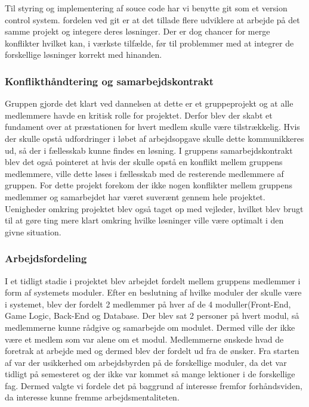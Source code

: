 Til styring og implementering af souce code har vi benytte git som et version control system.
fordelen ved git er at det tillade flere udviklere at arbejde på det samme projekt og integere 
deres løsninger. Der er dog chancer for merge konflikter hvilket kan, i værkste tilfælde, før
til problemmer med at integrer de forskellige løsninger korrekt med hinanden.

\subsubsection{Konflikthåndtering og samarbejdskontrakt}
Gruppen gjorde det klart ved dannelsen at dette er et gruppeprojekt og at alle medlemmere havde en kritisk rolle for projektet. Derfor blev der skabt et fundament over at præstationen for hvert medlem skulle være tilstrækkelig. Hvis der skulle opstå udfordringer i løbet af arbejdsopgave skulle dette kommunikkeres ud, så der i fællesskab kunne findes en løsning. I gruppens samarbejdskontrakt blev det også pointeret at hvis der skulle opstå en konflikt mellem gruppens medlemmere, ville dette løses i fællesskab med de resterende medlemmere af gruppen. For dette projekt forekom der ikke nogen konflikter mellem gruppens medlemmer og samarbejdet har været suverænt gennem hele projektet. Uenigheder omkring projektet blev også taget op med vejleder, hvilket blev brugt til at gøre ting mere klart omkring hvilke løsninger ville være optimalt i den givne situation. 

\subsubsection{Arbejdsfordeling}
I et tidligt stadie i projektet blev arbejdet fordelt mellem gruppens medlemmer i form af systemets moduler. Efter en beslutning af hvilke moduler der skulle være i systemet, blev der fordelt 2 medlemmer på hver af de 4 moduller(Front-End, Game Logic, Back-End og Database. Der blev sat 2 personer på hvert modul, så medlemmerne kunne rådgive og samarbejde om modulet. Dermed ville der ikke være et medlem som var alene om et modul. Medlemmerne ønskede hvad de foretrak at arbejde med og dermed blev der fordelt ud fra de ønsker. Fra starten af var der usikkerhed om arbejdsbyrden på de forskellige moduler, da det var tidligt på semesteret og der ikke var kommet så mange lektioner i de forskellige fag. Dermed valgte vi fordele det på baggrund af interesse fremfor forhåndsviden, da interesse kunne fremme arbejdsmentaliteten. 

